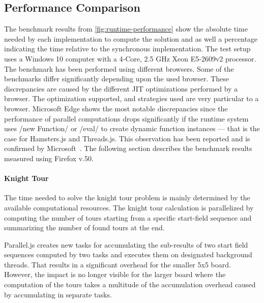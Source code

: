\subsection{Performance Comparison}
The benchmark results from \cref{fig:runtime-performance} show the absolute time needed by each implementation to compute the solution and as well a percentage indicating the time relative to the synchronous implementation. The test setup uses a Windows 10 computer with a 4-Core, 2.5 GHz Xeon E5-2609v2 processor. The benchmark has been performed using different browsers. Some of the benchmarks differ significantly depending upon the used browser. These discrepancies are caused by the different JIT optimizations performed by a browser. The optimization supported, and strategies used are very particular to a browser. Microsoft Edge shows the most notable discrepancies since the performance of parallel computations drops significantly if the runtime system uses \javascriptinline/new Function/ or \javascriptinline/eval/ to create dynamic function instances --- that is the case for Hamsters.js and Threads.js. This observation has been reported and is confirmed by Microsoft~\cite{newFunctionWebWorkerEdge}. The following section describes the benchmark results measured using Firefox v.50. 

\begin{figure*}
		
	\caption{Runtime Performance of Parallelization Problems Relative to Synchronously Execution}
	\label{fig:runtime-performance}
\end{figure*}


\paragraph{Knight Tour} The time needed to solve the knight tour problem is mainly determined by the available computational resources. The knight tour calculation is parallelized by computing the number of tours starting from a specific start-field sequence and summarizing the  number of found tours at the end. 

Parallel.js creates new tasks for accumulating the sub-results of two start field sequences computed by two tasks and executes them on designated background threads. That results in a significant overhead for the smaller 5x5 board. However, the impact is no longer visible for the larger board where the computation of the tours takes a multitude of the accumulation overhead caused by accumulating in separate tasks.

